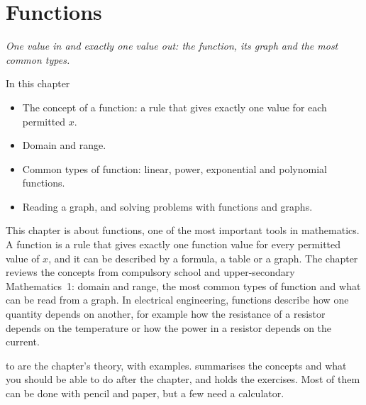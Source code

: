 
\chapter{Functions}
\label{c8:ch}

{\large\itshape One value in and exactly one value out: the function, its graph and the most common
types.\par}

\begin{chapterbox}{In this chapter}
\begin{itemize}
  \item The concept of a function: a rule that gives exactly one value for each permitted $x$.
  \item Domain and range.
  \item Common types of function: linear, power, exponential and polynomial functions.
  \item Reading a graph, and solving problems with functions and graphs.
\end{itemize}
\end{chapterbox}

This chapter is about functions, one of the most important tools in mathematics. A function is a
rule that gives exactly one function value for every permitted value of $x$, and it can be
described by a formula, a table or a graph. The chapter reviews the concepts from compulsory school
and upper-secondary Mathematics~1: domain and range, the most common types of function and what can
be read from a graph. In electrical engineering, functions describe how one quantity depends on
another, for example how the resistance of a resistor depends on the temperature or how the power
in a resistor depends on the current.

 to  are the chapter's theory, with examples.
 summarises the concepts and what you should be able to do after the
chapter, and  holds the exercises. Most of them can be done with pencil
and paper, but a few need a calculator.




